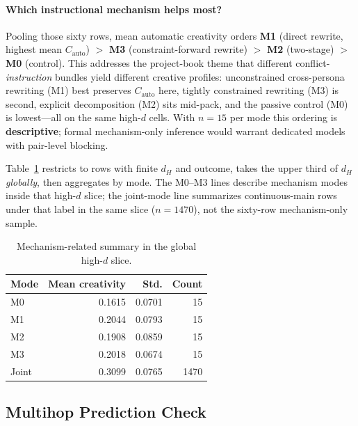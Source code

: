 \documentclass[sigconf,nonacm]{acmart}
\begin{document}
\paragraph{Which instructional mechanism helps most?}
Pooling those sixty rows, mean automatic creativity orders \textbf{M1} (direct rewrite, highest mean $C_{\mathrm{auto}}$) ${>}$ \textbf{M3} (constraint-forward rewrite) ${>}$ \textbf{M2} (two-stage) ${>}$ \textbf{M0} (control). This addresses the project-book theme that different conflict-\emph{instruction} bundles yield different creative profiles: unconstrained cross-persona rewriting (M1) best preserves $C_{\mathrm{auto}}$ here, tightly constrained rewriting (M3) is second, explicit decomposition (M2) sits mid-pack, and the passive control (M0) is lowest---all on the same high-$d$ cells.
With $n{=}15$ per mode this ordering is \textbf{descriptive}; formal mechanism-only inference would warrant dedicated models with pair-level blocking.

Table~\ref{tab:mechanism} restricts to rows with finite $d_H$ and outcome, takes the upper third of $d_H$ \emph{globally}, then aggregates by mode. The M0--M3 lines describe mechanism modes inside that high-$d$ slice; the joint-mode line summarizes continuous-main rows under that label in the same slice ($n{=}1470$), not the sixty-row mechanism-only sample.

\begin{table}[t]
\centering
\small
\begin{tabular}{lrrr}
\toprule
Mode & Mean creativity & Std. & Count \\
\midrule
M0 & 0.1615 & 0.0701 & 15 \\
M1 & 0.2044 & 0.0793 & 15 \\
M2 & 0.1908 & 0.0859 & 15 \\
M3 & 0.2018 & 0.0674 & 15 \\
Joint & 0.3099 & 0.0765 & 1470 \\
\bottomrule
\end{tabular}
\caption{Mechanism-related summary in the global high-$d$ slice.}
\label{tab:mechanism}
\end{table}

\subsection{Multihop Prediction Check}
\end{document}
